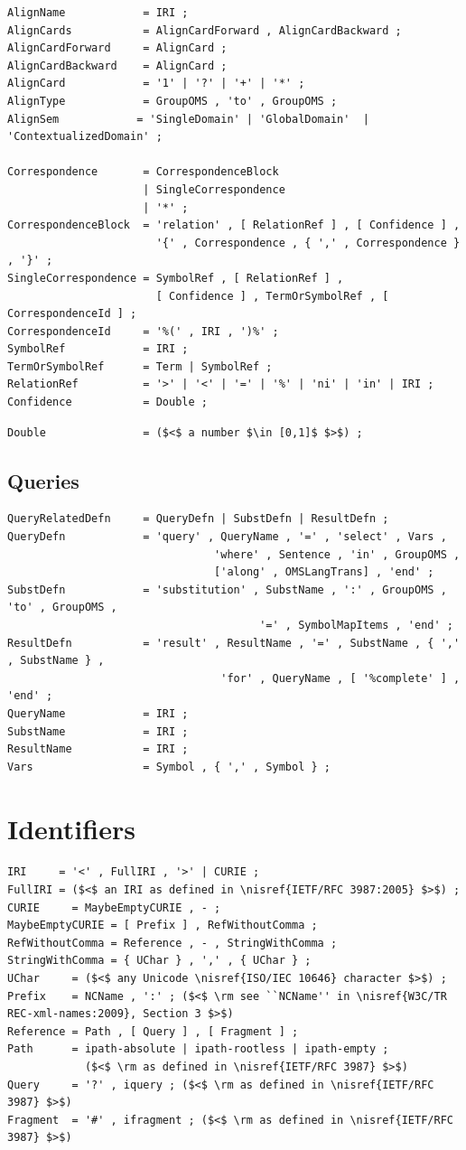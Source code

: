 \documentclass[10pt,fleqn,%
\ifpretendfinal
final%
\else
draft%
\fi,
]{scrreprt}
\newcommand{\sclause}[1]{\section{#1}}
\newcommand{\ssclause}[1]{\subsection{#1}}
\newcommand{\nisref}[1]{#1}
\begin{document}
\begin{lstlisting}[language=ebnf,mathescape]
AlignName            = IRI ;
AlignCards           = AlignCardForward , AlignCardBackward ;
AlignCardForward     = AlignCard ;
AlignCardBackward    = AlignCard ;
AlignCard            = '1' | '?' | '+' | '*' ;
AlignType            = GroupOMS , 'to' , GroupOMS ;
AlignSem            = 'SingleDomain' | 'GlobalDomain'  | 'ContextualizedDomain' ;

Correspondence       = CorrespondenceBlock
                     | SingleCorrespondence
                     | '*' ;
CorrespondenceBlock  = 'relation' , [ RelationRef ] , [ Confidence ] , 
                       '{' , Correspondence , { ',' , Correspondence } , '}' ;
SingleCorrespondence = SymbolRef , [ RelationRef ] ,
                       [ Confidence ] , TermOrSymbolRef , [ CorrespondenceId ] ;
CorrespondenceId     = '%(' , IRI , ')%' ;
SymbolRef            = IRI ;
TermOrSymbolRef      = Term | SymbolRef ;
RelationRef          = '>' | '<' | '=' | '%' | 'ni' | 'in' | IRI ;
Confidence           = Double ; 
\end{lstlisting}
\begin{lstlisting}[language=ebnf,escapeinside={()}]
Double               = ($<$ a number $\in [0,1]$ $>$) ;
\end{lstlisting}

\ssclause{Queries}

\begin{lstlisting}[language=ebnf,escapeinside={<>},mathescape]
QueryRelatedDefn     = QueryDefn | SubstDefn | ResultDefn ;
QueryDefn            = 'query' , QueryName , '=' , 'select' , Vars , 
                                'where' , Sentence , 'in' , GroupOMS , 
                                ['along' , OMSLangTrans] , 'end' ;
SubstDefn            = 'substitution' , SubstName , ':' , GroupOMS , 'to' , GroupOMS , 
                                       '=' , SymbolMapItems , 'end' ;
ResultDefn           = 'result' , ResultName , '=' , SubstName , { ',' , SubstName } ,
                                 'for' , QueryName , [ '%complete' ] , 'end' ;
QueryName            = IRI ;
SubstName            = IRI ;
ResultName           = IRI ;
Vars                 = Symbol , { ',' , Symbol } ;
\end{lstlisting}

\sclause{Identifiers}

\begin{lstlisting}[language=ebnf,escapeinside={()}]
IRI     = '<' , FullIRI , '>' | CURIE ;
FullIRI = ($<$ an IRI as defined in \nisref{IETF/RFC 3987:2005} $>$) ;
CURIE     = MaybeEmptyCURIE , - ;
MaybeEmptyCURIE = [ Prefix ] , RefWithoutComma ;
RefWithoutComma = Reference , - , StringWithComma ;
StringWithComma = { UChar } , ',' , { UChar } ;
UChar     = ($<$ any Unicode \nisref{ISO/IEC 10646} character $>$) ;
Prefix    = NCName , ':' ; ($<$ \rm see ``NCName'' in \nisref{W3C/TR REC-xml-names:2009}, Section 3 $>$)
Reference = Path , [ Query ] , [ Fragment ] ;
Path      = ipath-absolute | ipath-rootless | ipath-empty ;
            ($<$ \rm as defined in \nisref{IETF/RFC 3987} $>$)
Query     = '?' , iquery ; ($<$ \rm as defined in \nisref{IETF/RFC 3987} $>$)
Fragment  = '#' , ifragment ; ($<$ \rm as defined in \nisref{IETF/RFC 3987} $>$)
\end{lstlisting}
\end{document}
